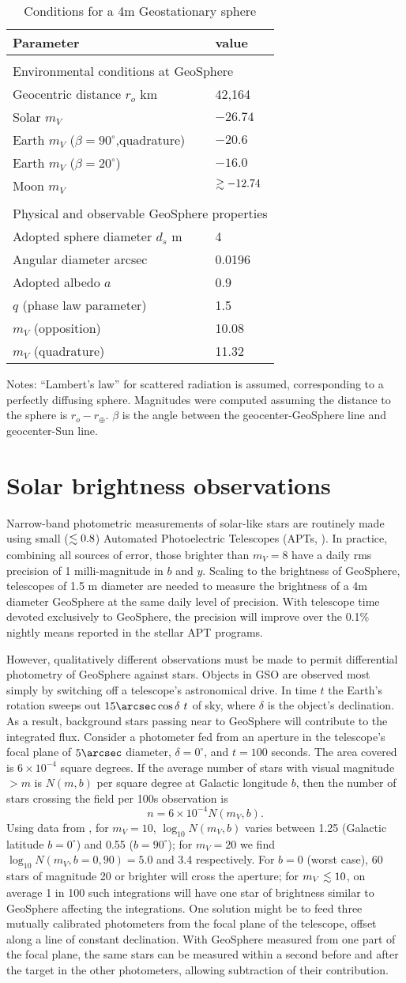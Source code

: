 \documentclass[useAMS,usenatbib]{mn2e}
\newcommand\lta { \mathrel {\hbox to 0pt {\lower 3.7pt \hbox{$\sim$}
      \hss} \raise 1.7pt \hbox{$<$}}}
\newcommand\gta { \mathrel {\hbox to 0pt {\lower 3.7pt \hbox{$\sim$}
      \hss} \raise 1.7pt \hbox{$>$}}}
\newcommand\name{LAMBERT}
\renewcommand\name{GeoSphere}
\newcommand\tableone{
\begin{table}
\label{tab:props}
\begin{center}
 \caption{Conditions for a 4m Geostationary sphere}
 \begin{tabular}{ll}     
 \hline
 \hline
Parameter & value \\
 \hline
\\
\multicolumn{2}{l}{Environmental conditions at \name{}}\\
Geocentric distance $r_o$ km & 42,164\\
Solar $m_V$  & $-26.74$ \\
Earth $m_V$ ($\beta=90^\circ$,quadrature) & $-20.6$ \\
Earth $m_V$ ($\beta=20^\circ$) & $-16.0$ \\
Moon $m_V$ & $\gta -12.74$\\
\\
\multicolumn{2}{l}{Physical and observable \name{} properties}\\
Adopted sphere diameter $d_s$ m & 4 \\
Angular diameter arcsec & 0.0196\\
Adopted albedo $a$ & 0.9 \\
$q$ (phase law parameter) & 1.5 \\
$m_V$ (opposition) & 10.08\\
$m_V$ (quadrature) & 11.32\\
 \hline
\end{tabular}
\end{center}
Notes: ``Lambert's law'' for scattered radiation is assumed, 
corresponding to a perfectly diffusing sphere. Magnitudes
were computed assuming the distance to the sphere is 
$r_o-r_\oplus$.  $\beta$ is the angle between the geocenter-\name
line and geocenter-Sun line. 
\end{table}}
\begin{document}
\tableone


\section{Solar brightness observations}

Narrow-band photometric measurements of solar-like stars are routinely
made using small ($\lta0.8$) Automated Photoelectric Telescopes (APTs,
\citealp{Henry1999, Hall+others2009}).  In practice, combining all
sources of error, those brighter than $m_V=8$ have a daily rms
precision of 1 milli-magnitude in $b$ and $y$.  Scaling to the
brightness of \name{}, telescopes of 1.5 m diameter are needed to
measure the brightness of a 4m diameter \name{} at the same daily
level of precision.  With telescope time devoted exclusively to
\name{}, the precision will improve over the 0.1\% nightly means
reported in the stellar APT programs.

However, qualitatively different observations must be made to permit
differential photometry of \name{} against stars.  Objects in GSO
are observed most simply by switching off a telescope's
astronomical drive.  In time $t$ the Earth's rotation sweeps out
$15\arcsec\cos\delta~t$ of sky, where $\delta$ is the object's
declination.  As a result, background stars passing near to \name{}
will contribute to the integrated flux.  Consider a photometer fed
from an aperture in the telescope's focal plane of $5\arcsec$
diameter, $\delta =0^\circ$, and $t= 100$ seconds.  The area covered
is $6\times10^{-4}$ square degrees. If the average number of stars
with visual magnitude $>m$ is $N(m,b)$ per square degree at Galactic
longitude $b$, then the number of stars crossing the field per 100s
observation is
%
$$
n= 6\times10^{-4} N(m_V,b). 
$$
%
Using data from \cite[][\S 117]{Allen1973}, for $m_V=10$, $\log_{10}
N(m_V,b)$ varies between 1.25 (Galactic latitude $b=0^\circ$) and 0.55
($b=90^\circ$); for $m_V=20$ we find $\log_{10}N(m_V,b=0,90)=5.0$ and
3.4 respectively.  For $b=0$ (worst case), 60 stars of magnitude 20 or
brighter will cross the aperture; for $m_V \lta10$, on average 1 in
100 such integrations will have one star of brightness similar to
\name{} affecting the integrations.  One solution might be to feed
three mutually calibrated photometers from the focal plane of the
telescope, offset along a line of constant declination.  With \name{}
measured from one part of the focal plane, the same stars can be
measured within a second before and after the target in the other
photometers, allowing subtraction of their contribution.
\end{document}
